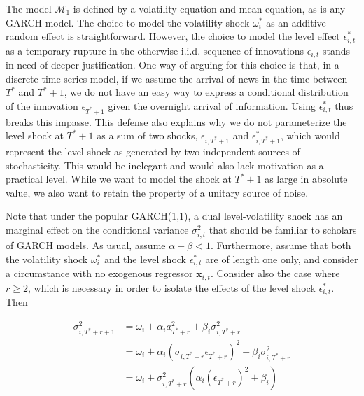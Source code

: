 \documentclass[11pt]{article}
\newcommand{\x}{\textbf{x}}
\def\mc#1{\mathcal{#1}} %
\def\mc#1{\mathcal{#1}}
\theoremstyle{definition}
\begin{document}

The model $\mc{M}_1$ is defined by a volatility equation and mean equation, as is any GARCH model.  The choice to model the volatility shock $\omega^{*}_{i}$ as an additive random effect is straightforward.  However, the choice to model the level effect $\epsilon^{*}_{i,t}$ as a temporary rupture in the otherwise i.i.d. sequence of innovations $\epsilon_{i,t}$ stands in need of deeper justification.  One way of arguing for this choice is that, in a discrete time series model, if we assume the arrival of news in the time between $T^{*}$ and $T^{*}+1$, we do not have an easy way to express a conditional distribution of the innovation $\epsilon_{T^{*}+1}$ given the overnight arrival of information.  Using $\epsilon^{*}_{i,t}$ thus breaks this impasse.  This defense also explains why we do not parameterize the level shock at $T^{*}+1$ as a sum of two shocks, $\epsilon_{i,T^{*}+1}$ and $\epsilon^{*}_{i,T^{*}+1}$, which would represent the level shock as generated by two independent sources of stochasticity.  This would be inelegant and would also lack motivation as a practical level.  While we want to model the shock at $T^{*}+1$ as large in absolute value, we also want to retain the property of a unitary source of noise.

Note that under the popular GARCH(1,1), a dual level-volatility shock has an marginal effect on the conditional variance $\sigma^{2}_{i,t}$ that should be familiar to scholars of GARCH models.  As usual, assume $\alpha+\beta < 1$.  Furthermore, assume that both the volatility shock $\omega^{*}_{i}$ and the level shock $\epsilon^{*}_{i,t}$ are of length one only, and consider a circumstance with no exogenous regressor $\x_{i,t}$. Consider also the case where $r\geq 2$, which is necessary in order to isolate the effects of the level shock $\epsilon^{*}_{i,t}$.  Then

\begin{align}
\sigma^{2}_{i,T^{*}+r+1} & = \omega_{i} + \alpha_{i} a_{T^{*}+r}^{2} + \beta_{i}\sigma^{2}_{i,T^{*}+r} \\
& = \omega_{i} + \alpha_{i}(\sigma_{i,T^{*}+r}\epsilon_{T^{*}+r})^{2} + \beta_{i}\sigma^{2}_{i,T^{*}+r} \\
& = \omega_{i} + \sigma^{2}_{i,T^{*}+r}(\alpha_{i} (\epsilon_{T^{*}+r})^{2} + \beta_{i})
\end{align}
\end{document}
